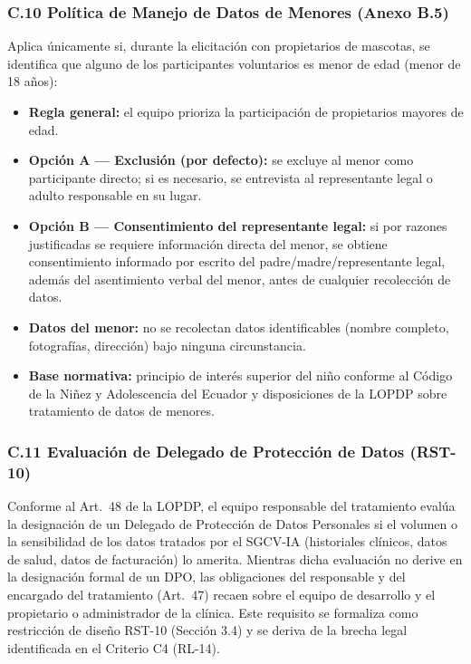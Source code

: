 \documentclass[
]{article}
\begin{document}
\subsubsection{C.10 Política de Manejo de Datos de Menores (Anexo B.5)}\label{c10-datos-menores}

Aplica únicamente si, durante la elicitación con propietarios de mascotas, se identifica que alguno de los participantes voluntarios es menor de edad (menor de 18 años):

\begin{itemize}
  \item \textbf{Regla general:} el equipo prioriza la participación de propietarios mayores de edad.
  \item \textbf{Opción A --- Exclusión (por defecto):} se excluye al menor como participante directo; si es necesario, se entrevista al representante legal o adulto responsable en su lugar.
  \item \textbf{Opción B --- Consentimiento del representante legal:} si por razones justificadas se requiere información directa del menor, se obtiene consentimiento informado por escrito del padre/madre/representante legal, además del asentimiento verbal del menor, antes de cualquier recolección de datos.
  \item \textbf{Datos del menor:} no se recolectan datos identificables (nombre completo, fotografías, dirección) bajo ninguna circunstancia.
  \item \textbf{Base normativa:} principio de interés superior del niño conforme al Código de la Niñez y Adolescencia del Ecuador y disposiciones de la LOPDP sobre tratamiento de datos de menores.
\end{itemize}

\subsubsection{C.11 Evaluación de Delegado de Protección de Datos
(RST-10)}\label{c11-delegado-proteccion-datos}

Conforme al Art.\ 48 de la LOPDP, el equipo responsable del tratamiento
evalúa la designación de un Delegado de Protección de Datos Personales
si el volumen o la sensibilidad de los datos tratados por el SGCV-IA
(historiales clínicos, datos de salud, datos de facturación) lo
amerita. Mientras dicha evaluación no derive en la designación formal
de un DPO, las obligaciones del responsable y del encargado del
tratamiento (Art.\ 47) recaen sobre el equipo de desarrollo y el
propietario o administrador de la clínica. Este requisito se formaliza
como restricción de diseño RST-10 (Sección 3.4) y se deriva de la
brecha legal identificada en el Criterio C4 (RL-14).
\end{document}
